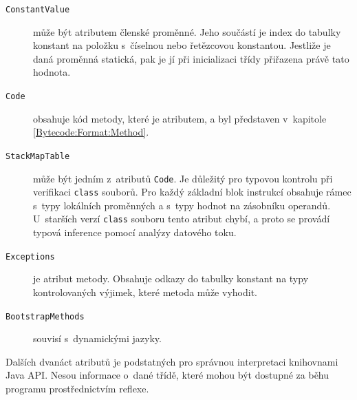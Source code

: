 \begin{description}

\item [\texttt{ConstantValue}] může být atributem členské proměnné. Jeho součástí je index do tabulky konstant na položku s~číselnou nebo řetězcovou konstantou. Jestliže je daná proměnná statická, pak je jí při inicializaci třídy přiřazena právě tato hodnota.

\item [\texttt{Code}] obsahuje kód metody, které je atributem, a byl představen v~kapitole \ref{Bytecode:Format:Method}.

\item [\texttt{StackMapTable}] může být jedním z~atributů \texttt{Code}. Je důležitý pro typovou kontrolu při verifikaci \texttt{class} souborů. Pro každý základní blok instrukcí obsahuje rámec s~typy lokálních proměnných a s~typy hodnot na zásobníku operandů. U~starších verzí \texttt{class} souboru tento atribut chybí, a proto se provádí typová inference pomocí analýzy datového toku.

\item [\texttt{Exceptions}] je atribut metody. Obsahuje odkazy do tabulky konstant na typy kontrolovaných výjimek, které metoda může vyhodit.

\item [\texttt{BootstrapMethods}] souvisí s~dynamickými jazyky.

\end{description}

Dalších dvanáct atributů je podstatných pro správnou interpretaci knihovnami Java API. Nesou informace o~dané třídě, které mohou být dostupné za běhu programu prostřednictvím reflexe.


